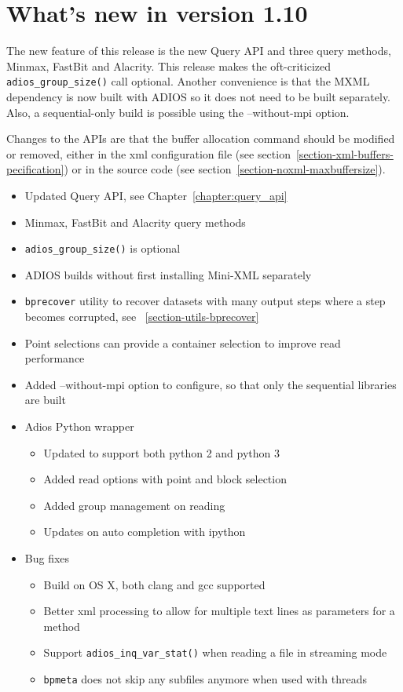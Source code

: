 %
%

\section {What's new in version 1.10}
The new feature of this release is the new Query API and three query methods, Minmax, FastBit and Alacrity. This release makes the oft-criticized \verb+adios_group_size()+ call optional. Another convenience is that the MXML dependency is now built with ADIOS so it does not need to be built separately. Also, a sequential-only build is possible using the --without-mpi option. 

Changes to the APIs are that the buffer allocation command should be modified or removed, either in the xml configuration file (see section~\ref{section-xml-buffers-pecification}) or in the source code (see section~\ref{section-noxml-maxbuffersize}).

\begin{itemize}
\item Updated Query API, see Chapter~\ref{chapter:query_api}
\item Minmax, FastBit and Alacrity query methods
\item \verb+adios_group_size()+ is optional
\item ADIOS builds without first installing Mini-XML separately
\item \verb+bprecover+ utility to recover datasets with many output steps where a step becomes corrupted, see ~\ref{section-utils-bprecover}
\item Point selections can provide a container selection to improve read performance
\item Added --without-mpi option to configure, so that only the sequential libraries are built
\item Adios Python wrapper
    \begin{itemize}
    \item Updated to support both python 2 and python 3
    \item Added read options with point and block selection
    \item Added group management on reading
    \item Updates on auto completion with ipython
    \end{itemize}

\item Bug fixes
    \begin{itemize}
    \item Build on OS X, both clang and gcc supported
    \item Better xml processing to allow for multiple text lines as parameters for a method
    \item Support \verb+adios_inq_var_stat()+ when reading a file in streaming mode
    \item \verb+bpmeta+ does not skip any subfiles anymore when used with threads
    \end{itemize}
\end{itemize}


